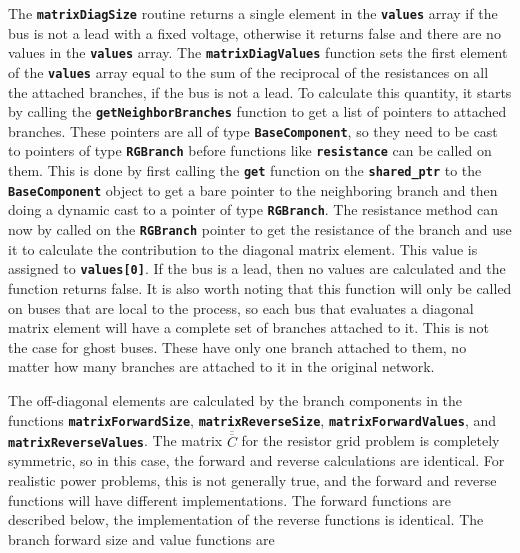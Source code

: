 The \texttt{\textbf{matrixDiagSize}} routine returns a single element in the \texttt{\textbf{values}} array if the bus is not a lead with a fixed voltage, otherwise it returns false and there are no values in the \texttt{\textbf{values}} array. The \texttt{\textbf{matrixDiagValues}} function sets the first element of the \texttt{\textbf{values}} array equal to the sum of the reciprocal of the resistances on all the attached branches, if the bus is not a lead. To calculate this quantity, it starts by calling the \texttt{\textbf{getNeighborBranches}} function to get a list of pointers to attached branches. These pointers are all of type \texttt{\textbf{BaseComponent}}, so they need to be cast to pointers of type \texttt{\textbf{RGBranch}} before functions like \texttt{\textbf{resistance}} can be called on them. This is done by first calling the \texttt{\textbf{get}} function on the \texttt{\textbf{shared\_ptr}} to the \texttt{\textbf{BaseComponent}} object to get a bare pointer to the neighboring branch and then doing a dynamic cast to a pointer of type \texttt{\textbf{RGBranch}}. The resistance method can now by called on the \texttt{\textbf{RGBranch}} pointer to get the resistance of the branch and use it to calculate the contribution to the diagonal matrix element. This value is assigned to \texttt{\textbf{values[0]}}. If the bus is a lead, then no values are calculated and the function returns false. It is also worth noting that this function will only be called on buses that are local to the process, so each bus that evaluates a diagonal matrix element will have a complete set of branches attached to it. This is not the case for ghost buses. These have only one branch attached to them, no matter how many branches are attached to it in the original network.

The off-diagonal elements are calculated by the branch components in the functions \texttt{\textbf{matrixForwardSize}}, \texttt{\textbf{matrixReverseSize}}, \texttt{\textbf{matrixForwardValues}}, and \texttt{\textbf{matrixReverseValues}}. The matrix $\overline{\overline{C}}$ for the resistor grid problem is completely symmetric, so in this case, the forward and reverse calculations are identical. For realistic power problems, this is not generally true, and the forward and reverse functions will have different implementations. The forward functions are described below, the implementation of the reverse functions is identical. The branch forward size and value functions are

